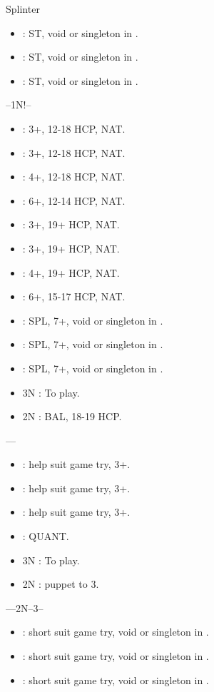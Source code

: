 \documentclass[12pt,twoside,a5paper]{report}%
\begin{document}
	Splinter
	\begin{itemize}
	\renewcommand{\labelitemi}{}
	\item {} : ST, void or singleton in \cl{}.
	\item {} : ST, void or singleton in \di{}.
	\item {} : ST, void or singleton in \he{}.
	\end{itemize}

	--1N!--
	\begin{itemize}
	\renewcommand{\labelitemi}{}
	\item {} : 3+\cl{}, 12-18 HCP, NAT.
	\item {} : 3+\di{}, 12-18 HCP, NAT.
	\item {} : 4+\he{}, 12-18 HCP, NAT.
	\item {} : 6+\sp{}, 12-14 HCP, NAT.
	\item {} : 3+\cl{}, 19+ HCP, NAT.
	\item {} : 3+\di{}, 19+ HCP, NAT.
	\item {} : 4+\he{}, 19+ HCP, NAT.
	\item {} : 6+\sp{}, 15-17 HCP, NAT.
	\item {} : SPL, 7+\sp{}, void or singleton in \cl{}.
	\item {} : SPL, 7+\sp{}, void or singleton in \di{}.
	\item {} : SPL, 7+\sp{}, void or singleton in \he{}.
	\item 3N : To play.
	\item 2N : BAL, 18-19 HCP.
	\end{itemize}

	----
	\begin{itemize}
	\renewcommand{\labelitemi}{} 
	\item {} : help suit game try, 3+\cl{}.
	\item {} : help suit game try, 3+\di{}.
	\item {} : help suit game try, 3+\he{}.
	\item {} : QUANT.
	\item 3N : To play.
	\item 2N : puppet to 3\cl{}.
	\end{itemize}

	----2N--3\cl{}--
	\begin{itemize}
	\renewcommand{\labelitemi}{}
	\item {} : short suit game try, void or singleton in \di{}.
	\item {} : short suit game try, void or singleton in \he{}.
	\item {} : short suit game try, void or singleton in \cl{}.
	\end{itemize}
\end{document}
